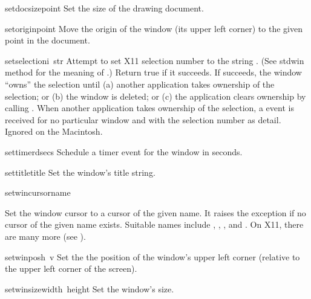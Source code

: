 \begin{funcdesc}{setdocsize}{point}
Set the size of the drawing document.
\end{funcdesc}

\begin{funcdesc}{setorigin}{point}
Move the origin of the window (its upper left corner)
to the given point in the document.
\end{funcdesc}

\begin{funcdesc}{setselection}{i\, str}
Attempt to set X11 selection number
to the string
.
(See stdwin method
for the meaning of
.)
Return true if it succeeds.
If  succeeds, the window ``owns'' the selection until
(a) another application takes ownership of the selection; or
(b) the window is deleted; or
(c) the application clears ownership by calling
.
When another application takes ownership of the selection, a
event is received for no particular window and with the selection number
as detail.
Ignored on the Macintosh.
\end{funcdesc}

\begin{funcdesc}{settimer}{dsecs}
Schedule a timer event for the window in
seconds.
\end{funcdesc}

\begin{funcdesc}{settitle}{title}
Set the window's title string.
\end{funcdesc}

\begin{funcdesc}{setwincursor}{name}
\begin{sloppypar}
Set the window cursor to a cursor of the given name.
It raises the
exception if no cursor of the given name exists.
Suitable names include
,
,
,
and
.
On X11, there are many more (see
).
\end{sloppypar}
\end{funcdesc}

\begin{funcdesc}{setwinpos}{h\, v}
Set the the position of the window's upper left corner (relative to
the upper left corner of the screen).
\end{funcdesc}

\begin{funcdesc}{setwinsize}{width\, height}
Set the window's size.
\end{funcdesc}

